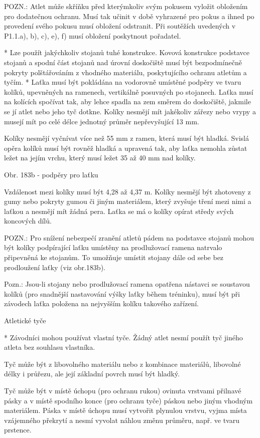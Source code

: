 POZN.: Atlet může skříňku před kterýmkoliv svým pokusem vyložit obložením pro dodatečnou ochranu. Musí tak učinit v době vyhrazené pro pokus a ihned po provedení svého pokusu musí obložení odstranit. Při soutěžích uvedených v P1.1.a), b), c), e), f) musí obložení poskytnout pořadatel.

* Lze použít jakýchkoliv stojanů tuhé konstrukce. Kovová konstrukce podstavce stojanů a spodní část stojanů nad úrovní doskočiště musí být bezpodmínečně pokryty polštářováním z vhodného materiálu, poskytujícího ochranu atletům a tyčím.
* Laťka musí být pokládána na vodorovně umístěné podpěry ve tvaru kolíků, upevněných na ramenech, vertikálně posuvných po stojanech. Laťka musí na kolících spočívat tak, aby lehce spadla na zem směrem do doskočiště, jakmile se jí atlet nebo jeho tyč dotkne. Kolíky nesmějí mít jakékoliv zářezy nebo vrypy a musejí mít po celé délce jednotný průměr nepřevyšující 13 mm.

Kolíky nesmějí vyčnívat více než 55 mm z ramen, která musí být hladká. Svislá opěra kolíků musí být rovněž hladká a upravená tak, aby laťka nemohla zůstat ležet na jejím vrchu, který musí ležet 35 až 40 mm nad kolíky.

Obr. 183b - podpěry pro laťku

Vzdálenost mezi kolíky musí být 4,28 až 4,37 m. Kolíky nesmějí být zhotoveny z gumy nebo pokryty gumou či jiným materiálem, který zvyšuje tření mezi nimi a laťkou a nesmějí mít žádná pera. Laťka se má o kolíky opírat středy svých koncových dílů.

POZN.: Pro snížení nebezpečí zranění atletů pádem na podstavce stojanů mohou být kolíky podpírající laťku umístěny na prodlužovací ramena natrvalo připevněná ke stojanům. To umožňuje umístit stojany dále od sebe bez prodloužení laťky (viz obr.183b).

Pozn.: Jsou-li stojany nebo prodlužovací ramena opatřena nástavci se soustavou kolíků (pro snadnější nastavování výšky laťky během tréninku), musí být při závodech laťka položena na nejvyšším kolíku takového zařízení.

Atletické tyče

* Závodníci mohou používat vlastní tyče. Žádný atlet nesmí použít tyč jiného atleta bez souhlasu vlastníka.

Tyč může být z libovolného materiálu nebo z kombinace materiálů, libovolné délky i průřezu, ale její základní povrch musí být hladký.

Tyč může být v místě úchopu (pro ochranu rukou) ovinuta vrstvami přilnavé pásky a v místě spodního konce (pro ochranu tyče) páskou nebo jiným vhodným materiálem. Páska v místě úchopu musí vytvořit plynulou vrstvu, vyjma místa vzájemného překrytí a nesmí vyvolat náhlou změnu průměru, např. ve tvaru prstence.

